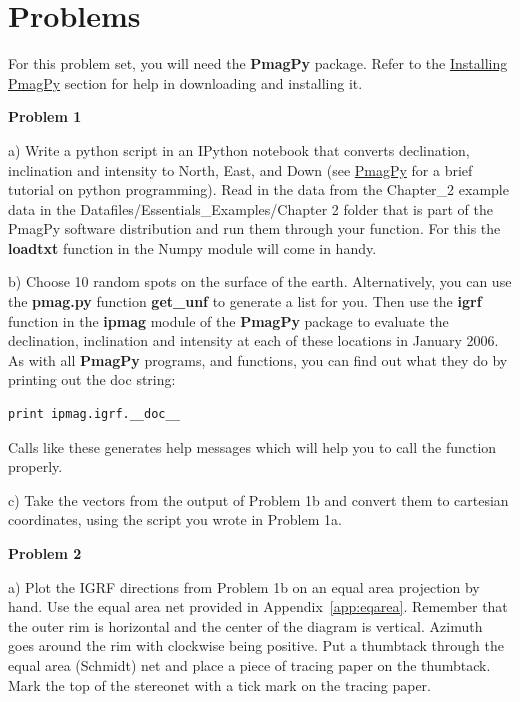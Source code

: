 \vskip 24pt
{\parindent 0pt \parskip 12pt 
\section{Problems}
 
For this problem set, you will need the {\bf PmagPy}  package.  Refer to the \href{http://earthref.org/PmagPy/cookbook#http://earthref.org/PmagPy/cookbook/#quick_start}{Installing PmagPy} section for help in downloading and installing it.  




{\bf Problem 1}


a) Write a python script in an IPython notebook
that converts
declination, inclination and intensity to North, East, and Down (see \href{http://earthref.org/PmagPy/cookbook/#Python}{PmagPy} for a brief tutorial on python programming).   Read in the data from the Chapter\_2 example data in the Datafiles/Essentials\_Examples/Chapter 2 folder that is part of the PmagPy software distribution and run them through your function.  For this the {\bf loadtxt} function in the Numpy module will come in handy.   


b) Choose 10 random spots on the surface of the earth.  Alternatively, you can use the {\bf pmag.py} function {\bf get\_unf} to generate a list for you.  Then 
use the {\bf igrf} function  in the {\bf ipmag} module of the   {\bf PmagPy}  package to  evaluate  the declination, inclination and intensity at each of these locations in January 2006.  As with all {\bf PmagPy} programs, and functions, you can find out what they do by printing out the doc string:

\begin{verbatim}
print ipmag.igrf.__doc__
\end{verbatim}

\noindent  Calls like these generates  help messages which will help you to call the function properly.  



c) Take the vectors from the output of  Problem 1b and convert them to cartesian coordinates, using the  script you wrote in Problem 1a.  


{\bf Problem 2}

a) Plot the IGRF directions from Problem 1b  on an equal area projection by hand.    Use the equal area net provided in Appendix~\ref{app:eqarea}.   Remember that the outer rim is  horizontal and the center of the diagram is vertical.  Azimuth goes around the rim with clockwise being positive.    Put a  thumbtack through the equal area (Schmidt) net and place a piece of tracing paper on the thumbtack. Mark the top of the stereonet with a tick mark on the tracing paper. 

}

